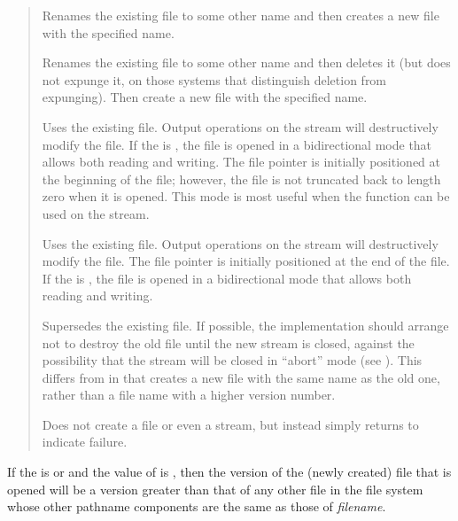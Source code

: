 \begin{defun}[Function]
\begin{flushdesc}
\begin{quotation}
\begin{flushdesc}
\item[\cd{:rename}]
Renames the existing file to some other name and then creates a new file
with the specified name.

\item[\cd{:rename-and-delete}]
Renames the existing file to some other name and then deletes it (but
does not expunge it, on those systems that distinguish deletion from
expunging).  Then create a new file with the specified name.

\item[\cd{:overwrite}]
Uses the existing file.  Output operations on the stream
will destructively modify the file.
If the  is ,
the file is opened in a bidirectional mode that allows both
reading and writing.  The file pointer is initially positioned
at the beginning of the file; however, the file is not truncated
back to length zero when it is opened.
This mode is most useful when
the  function can be used on the stream.

\item[\cd{:append}]
Uses the existing file.  Output operations on the stream
will destructively modify the file.  The file pointer is
initially positioned at the end of the file.
If the  is ,
the file is opened in a bidirectional mode that allows both
reading and writing.

\item[\cd{:supersede}]
Supersedes the existing file.  If possible, the implementation should
arrange not to destroy the old file until the new stream is closed,
against the possibility that the stream will be closed in ``abort'' mode
(see ).
This differs from  in that  creates
a new file with the same name as the old one, rather than a file
name with a higher version number.

\item[\cd{\false}]
Does not create a file or even a stream, but instead
simply returns {\false} to indicate failure.
\end{flushdesc}
\end{quotation}

If the  is  or 
and the value of  is ,
then the version of the (newly created) file that is opened will
be a version greater than that of any other file in the file system
whose other pathname components are the same as those of \emph{filename}.


\end{flushdesc}
\end{defun}
